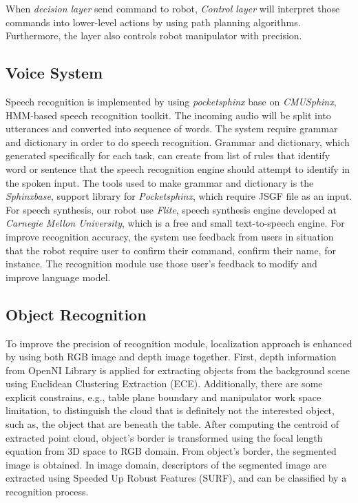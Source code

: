 \documentclass{llncs}
\begin{document}
When \textit{decision layer} send command to robot, \textit{Control layer} will interpret those commands into lower-level actions by using path planning algorithms. Furthermore, the layer also controls robot manipulator with precision.

\subsection{Voice System}

Speech recognition is implemented by using \textit{pocketsphinx} base on \textit{CMUSphinx}, HMM-based speech recognition toolkit. The incoming audio will be split into utterances and converted into sequence of words. The system require grammar and dictionary in order to do speech recognition. Grammar and dictionary, which generated specifically for each task, can create from list of rules that identify word or sentence that the speech recognition engine should attempt to identify in the spoken input. The tools used to make grammar and dictionary is the \textit{Sphinxbase}, support library for \textit{Pocketsphinx}, which require JSGF file as an input. For speech synthesis, our robot use \textit{Flite}, speech synthesis engine developed at \textit{Carnegie Mellon University}, which is a free and small text-to-speech engine. For improve recognition accuracy, the system use feedback from users in situation that the robot require user to confirm their command, confirm their name, for instance. The recognition module use those user's feedback to modify and improve language model.

\subsection{Object Recognition}
    
To improve the precision of recognition module, localization approach is enhanced by using both RGB image and depth image together. First, depth information from OpenNI Library is applied for extracting objects from the background scene using Euclidean Clustering Extraction (ECE)\cite{ece}\cite{rudu.thesis}. Additionally, there are some explicit constrains, e.g., table plane boundary and manipulator work space limitation, to distinguish the cloud that is definitely not the interested object, such as, the object that are beneath the table. After computing the centroid of extracted point cloud, object's border is transformed using the focal length equation from 3D space to RGB domain. From object's border, the segmented image is obtained. In image domain, descriptors of the segmented image are extracted using Speeded Up Robust Features (SURF), and can be classified by a recognition process.
\end{document}
